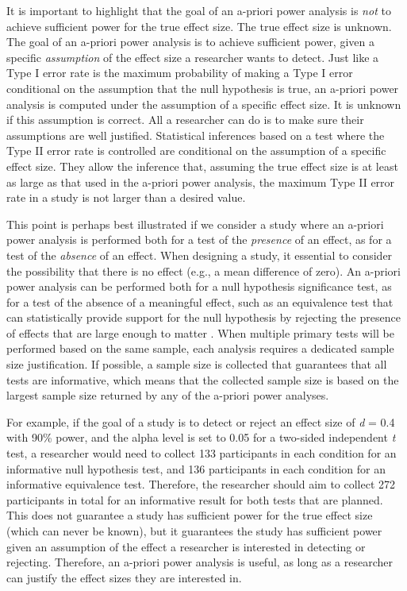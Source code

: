 \documentclass[
  oneside]{book}
\begin{document}
It is important to highlight that the goal of an a-priori power analysis is \emph{not} to achieve sufficient power for the true effect size. The true effect size is unknown. The goal of an a-priori power analysis is to achieve sufficient power, given a specific \emph{assumption} of the effect size a researcher wants to detect. Just like a Type I error rate is the maximum probability of making a Type I error conditional on the assumption that the null hypothesis is true, an a-priori power analysis is computed under the assumption of a specific effect size. It is unknown if this assumption is correct. All a researcher can do is to make sure their assumptions are well justified. Statistical inferences based on a test where the Type II error rate is controlled are conditional on the assumption of a specific effect size. They allow the inference that, assuming the true effect size is at least as large as that used in the a-priori power analysis, the maximum Type II error rate in a study is not larger than a desired value.

This point is perhaps best illustrated if we consider a study where an a-priori power analysis is performed both for a test of the \emph{presence} of an effect, as for a test of the \emph{absence} of an effect. When designing a study, it essential to consider the possibility that there is no effect (e.g., a mean difference of zero). An a-priori power analysis can be performed both for a null hypothesis significance test, as for a test of the absence of a meaningful effect, such as an equivalence test that can statistically provide support for the null hypothesis by rejecting the presence of effects that are large enough to matter \citep{meyners_equivalence_2012, lakens_equivalence_2017, rogers_using_1993}. When multiple primary tests will be performed based on the same sample, each analysis requires a dedicated sample size justification. If possible, a sample size is collected that guarantees that all tests are informative, which means that the collected sample size is based on the largest sample size returned by any of the a-priori power analyses.

For example, if the goal of a study is to detect or reject an effect size of \emph{d} = 0.4 with 90\% power, and the alpha level is set to 0.05 for a two-sided independent \emph{t} test, a researcher would need to collect 133 participants in each condition for an informative null hypothesis test, and 136 participants in each condition for an informative equivalence test. Therefore, the researcher should aim to collect 272 participants in total for an informative result for both tests that are planned. This does not guarantee a study has sufficient power for the true effect size (which can never be known), but it guarantees the study has sufficient power given an assumption of the effect a researcher is interested in detecting or rejecting. Therefore, an a-priori power analysis is useful, as long as a researcher can justify the effect sizes they are interested in.
\end{document}
